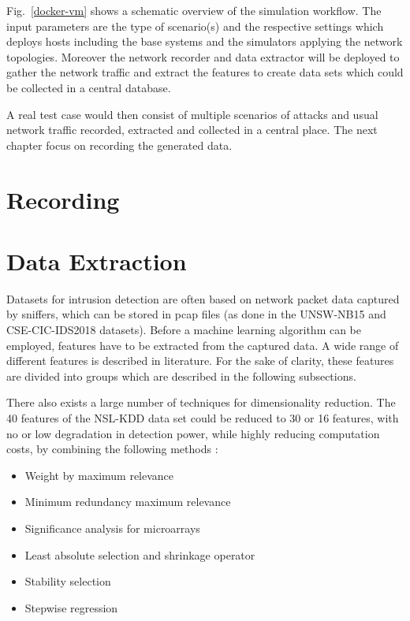 \documentclass[conference]{IEEEtran}
\begin{document}
Fig.~\ref{docker-vm} shows a schematic overview of the simulation workflow. The input parameters are the type of scenario(s) and the respective settings which deploys hosts including the base systems and the simulators applying the network topologies. Moreover the network recorder and data extractor will be deployed to gather the network traffic and extract the features to create data sets which could be collected in a central database.

A real test case would then consist of multiple scenarios of attacks and usual network traffic recorded, extracted and collected in a central place. The next chapter focus on recording the generated data.

\section{Recording}

\section{Data Extraction}

Datasets for intrusion detection are often based on network packet data captured by sniffers, which can be stored in pcap files (as done in the UNSW-NB15 \cite{Nb2015} and CSE-CIC-IDS2018 \cite{Ids2018} datasets). Before a machine learning algorithm can be employed, features have to be extracted from the captured data. A wide range of different features is described in literature. For the sake of clarity, these features are divided into groups which are described in the following subsections.

There also exists a large number of techniques for dimensionality reduction. The 40 features of the NSL-KDD data set could be reduced to 30 or 16 features, with no or low degradation in detection power, while highly reducing computation costs, by combining the following methods \cite{vasquez2014}:
\begin{itemize}
	\item Weight by maximum relevance
	\item Minimum redundancy maximum relevance
	\item Significance analysis for microarrays
	\item Least absolute selection and shrinkage operator
	\item Stability selection
	\item Stepwise regression
\end{itemize}
\end{document}
